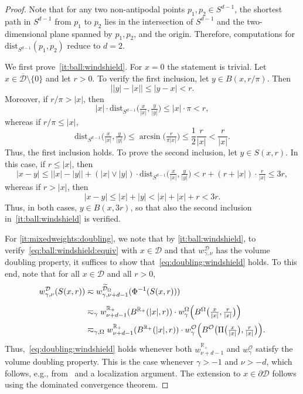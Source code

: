 \documentclass[12pt,a4paper, reqno]{amsart}
\theoremstyle{plain}
\theoremstyle{definition}
\theoremstyle{remark}
\numberwithin{equation}{section}
\newcommand{\1}{\mathbbm{1}}
\newcommand{\R}{\ensuremath{\mathbb{R}}}
\newcommand{\calO}{\ensuremath{\mathcal{O}}}
\newcommand{\calD}{\ensuremath{\mathcal{D}}}
\begin{document}
\begin{proof}
Note that for any two non-antipodal points $p_1,p_2 \in S^{d-1}$, the shortest path in $S^{d-1}$ from $p_1$ to $p_2$ lies in the intersection of $S^{d-1}$ and the two-dimensional plane spanned by $p_1,p_2$, and the origin. Therefore, computations for $\mathrm{dist}_{S^{d-1}}(p_1,p_2)$ reduce to $d=2$. 

 We first prove~\ref{it:ball:windshield}. For $x=0$ the statement is trivial.
 Let $x\in\overline{\calD}\setminus\{0\}$ and let $r>0$. To verify the first inclusion, let $y\in B(x,r/\pi)$. Then  
 \[
 \big| | y| - \lvert x\rvert \big| \leq \lvert y-x\rvert <r.
 \]
Moreover, if $r/\pi>\lvert x\rvert$, then 
 \[
 \lvert x\rvert\cdot 
 \mathrm{dist}_{S^{d-1}}\big(\tfrac{x}{\lvert x\rvert},\tfrac{y}{\lvert y\rvert}\big)
 \leq 
 \lvert x\rvert\cdot  \pi 
 <
 r,
 \]
whereas if $r/\pi\leq \lvert x\rvert$,
\[
 \mathrm{dist}_{S^{d-1}}\big(\tfrac{x}{\lvert x\rvert},\tfrac{y}{\lvert y\rvert}\big)
 \leq 
 \arcsin\big(\tfrac{r}{\pi\lvert x\rvert}\big) 
 \leq
 \frac{1}{2}\frac{r}{\lvert x\rvert}
 < \frac{r}{\lvert x\rvert}.
\]
Thus, the first inclusion holds. To prove the second inclusion, let $y\in S(x,r)$. In this case, if $r\leq \lvert x\rvert$, then
\[
\lvert x-y\rvert \leq \big| \lvert x\rvert - \lvert y\rvert\big| + (\lvert x\rvert \lor \lvert y\rvert)\cdot \mathrm{dist}_{S^{d-1}}\big(\tfrac{x}{\lvert x\rvert},\tfrac{y}{\lvert y\rvert}\big)
< r + (r+\lvert x\rvert)\cdot \tfrac{r}{\lvert x\rvert}
\leq 3r,
\]
whereas if $r>\lvert x\rvert$, then
\[
\lvert x-y\rvert 
\leq 
\lvert x\rvert + \lvert y\rvert
<
\lvert x\rvert + \lvert x\rvert + r
<
3r.
\]
Thus, in both cases, $y\in B(x,3r)$, so that also the second inclusion in~\ref{it:ball:windshield} is verified.

For \ref{it:mixedweights:doubling}, we note that by \ref{it:ball:windshield}, to verify~\eqref{eq:ball:windshield:equiv} with $x\in\calD$ and that $w_{\gamma,\nu}^\calD$ has the volume doubling property, it suffices to show that~\eqref{eq:doubling:windshield} holds.
To this end, note that for all $x\in\calD$ and all $r>0$, 
\begin{align}
    w_{\gamma,\nu}^\calD(S(x,r))
    &\eqsim
    w_{\gamma,\nu+d-1}^{\widetilde{\calD}_\Omega} (\Phi^{-1}(S(x,r)))\notag\\[.5em]
    &\eqsim_\gamma
    w_{\nu+d-1}^{\R_+}(B^{\R_+}(\lvert x\rvert,r)) \cdot 
    w_\gamma^{\Omega}\Big(B^{\Omega}\big(\tfrac{x}{|x|},\tfrac{r}{\lvert x\rvert}\big)\Big)\label{eq:split:S}\\
    &\eqsim_{\gamma,\Omega} w_{\nu+d-1}^{\R_+}(B^{\R_+}(\lvert x\rvert,r)) \cdot 
    w_\gamma^{\calO}\Big(B^{\calO}\big(\Pi\big(\tfrac{x}{|x|}\big),\tfrac{r}{\lvert x\rvert}\big)\Big). \notag
\end{align}
Thus,~\eqref{eq:doubling:windshield} holds whenever both $w_{\nu+d-1}^{\R_+}$ and $w_\gamma^{\calO}$ 
satisfy the volume doubling property. 
This is the case whenever $\gamma>-1$ and $\nu>-d$, which follows, e.g., from~\cite[Example~7.1.6]{Grafakos2014classical} and a localization argument.
The extension to $x\in \partial\calD$ follows using the dominated convergence theorem. 


\end{proof}
\end{document}
